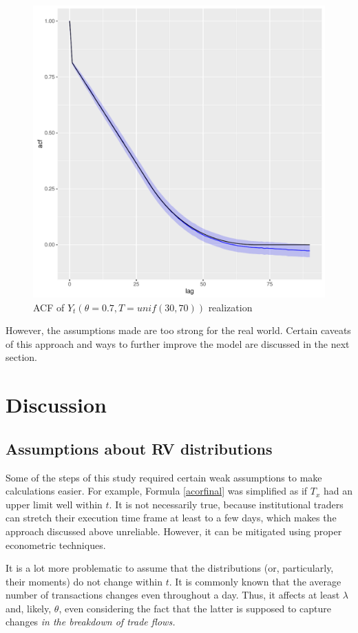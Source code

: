 \documentclass[12pt]{article}
\begin{document}
\begin{figure}[H]
  \centering
    \includegraphics[width=\textwidth]{acfu}
   \caption{ACF of $Y_t(\theta =0.7, T=unif(30,70))$ realization}\label{fig:acfu}  
\end{figure}
However, the assumptions made are too strong for the real world. Certain caveats of this approach and ways to further improve the model are discussed in the next section.
\newpage

\section{Discussion}\label{sec:disc}
\subsection{Assumptions about RV distributions}
Some of the steps of this study required certain weak assumptions to make calculations easier. For example, Formula \eqref{acorfinal} was simplified as if $T_x$ had an upper limit well within $t$. It is not necessarily true, because institutional traders can stretch their execution time frame at least to a few days, which makes the approach discussed above unreliable. However, it can be mitigated using proper econometric techniques.

It is a lot more problematic to assume that the distributions (or, particularly, their moments) do not change within $t$. It is commonly known that the average number of transactions changes even throughout a day. Thus, it affects at least $\lambda$ and, likely, $\theta$, even considering the fact that the latter is supposed to capture changes \textit{in the breakdown of trade flows.} 
\end{document}
